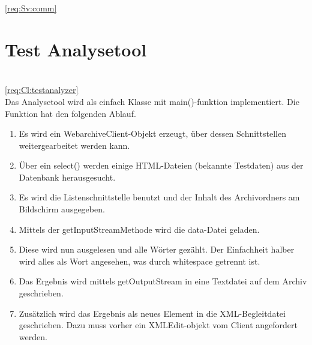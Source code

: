\ref{req:Sv:comm}
\section{Test Analysetool} 
\liable{\sab} \\
\ref{req:Cl:testanalyzer} \\
	Das Analysetool wird als einfach Klasse mit main()-funktion implementiert.
	Die Funktion hat den folgenden Ablauf.
	\begin{enumerate}
		\item Es wird ein WebarchiveClient-Objekt erzeugt, über dessen Schnittstellen weitergearbeitet werden kann.
		\item Über ein select() werden einige HTML-Dateien (bekannte Testdaten) aus der Datenbank herausgesucht.
		\item Es wird die Listenschnittstelle benutzt und der Inhalt des Archivordners am Bildschirm ausgegeben.
		\item Mittels der getInputStreamMethode wird die data-Datei geladen.
		\item Diese wird nun ausgelesen und alle Wörter gezählt. Der Einfachheit halber wird alles als Wort angesehen, was durch whitespace getrennt ist.
		\item Das Ergebnis wird mittels  getOutputStream in eine Textdatei auf dem Archiv geschrieben.
		\item Zusätzlich wird das Ergebnis als neues Element in die XML-Begleitdatei geschrieben.
			Dazu muss vorher ein XMLEdit-objekt vom Client angefordert werden.
	\end{enumerate}
		
